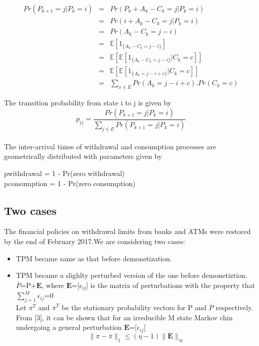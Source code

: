 \documentclass[12pt]{article}
\begin{document}
\begin{eqnarray}
Pr(P_{k+1} = j | P_{k} = i)&=&Pr(P_{k} + A_{k} - C_{k} = j | P_{k} = i) \\
&=&Pr(  i + A_{k} - C_{k} = j | P_{k}  = i)\\
&=&Pr(  A_{k} - C_{k} = j-i )\\
&=&\mathbb{E} [ 1_{\lbrace A_{k} - C_{k} = j-i \rbrace} ] \\
&=&\mathbb{E}[\mathbb{E} [ 1_{\lbrace A_{k} - C_{k} = j-i \rbrace}|C_{k} = c ] ]\\
&=&\mathbb{E}[\mathbb{E}[1_{\lbrace A_{k} = j-i+c \rbrace}|C_{k} = c ]] \\
&=&\sum_{x\in\textit{E}} Pr(A_{k} = j-i+c).Pr(C_{k} = c)
\end{eqnarray}

The transition probability from state i to j is given by
\begin{equation}
p_{ij} = \frac{Pr(P_{k+1} = j | P_{k} = i)}{\sum_{j\in\textit{E}}Pr(P_{k+1} = j | P_{k} = i)}
\end{equation}

\paragraph{}
The inter-arrival times of withdrawal and consumption processes are geometrically distributed with parameters given by
\begin{center}
 pwithdrawal = 1 - Pr(zero withdrawal)\\
 pconsumption = 1 - Pr(zero consumption)
\end{center}
\subsection{Two cases}
The financial policies on withdrawal limits from banks and ATMs were restored by the end of February 2017.We are considering two cases:\\
\begin{itemize}
	\item TPM became same as that before demonetization. 
	\item TPM became a slighlty perturbed version of the one before demonetiztion. \\
	$\overline{P}$=P+$\textbf{E}$, \hspace{2pt} where $\textbf{E}$=[$\epsilon_{ij}$] is the matrix of perturbations with the property that $\sum_{j=1}^{M}\epsilon_{ij}$=0\\
	Let $\pi^{T}$ and $\overline{\pi}^{T}$ be the stationary probability vectors for P and $\overline{P}$ respectively.\\
	From [3], it can be shown that for an irreducible M state Markov chin undergoing a general perturbation $\textbf{E}$=[$\epsilon_{ij}$]\\
	\begin{equation}
		\| \pi - \overline{\pi}\|_{1} \leq (\eta-1)\|\textbf{E}\|_{\infty}
	\end{equation}
\end{itemize}
\end{document}
